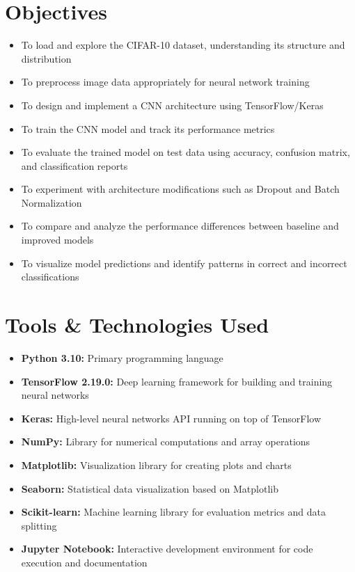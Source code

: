 \documentclass[12pt]{article}
\begin{document}
\section{Objectives}
\begin{itemize}
    \item To load and explore the CIFAR-10 dataset, understanding its structure and distribution
    \item To preprocess image data appropriately for neural network training
    \item To design and implement a CNN architecture using TensorFlow/Keras
    \item To train the CNN model and track its performance metrics
    \item To evaluate the trained model on test data using accuracy, confusion matrix, and classification reports
    \item To experiment with architecture modifications such as Dropout and Batch Normalization
    \item To compare and analyze the performance differences between baseline and improved models
    \item To visualize model predictions and identify patterns in correct and incorrect classifications
\end{itemize}

\section{Tools \& Technologies Used}
\begin{itemize}
    \item \textbf{Python 3.10:} Primary programming language
    \item \textbf{TensorFlow 2.19.0:} Deep learning framework for building and training neural networks
    \item \textbf{Keras:} High-level neural networks API running on top of TensorFlow
    \item \textbf{NumPy:} Library for numerical computations and array operations
    \item \textbf{Matplotlib:} Visualization library for creating plots and charts
    \item \textbf{Seaborn:} Statistical data visualization based on Matplotlib
    \item \textbf{Scikit-learn:} Machine learning library for evaluation metrics and data splitting
    \item \textbf{Jupyter Notebook:} Interactive development environment for code execution and documentation
\end{itemize}
\end{document}
